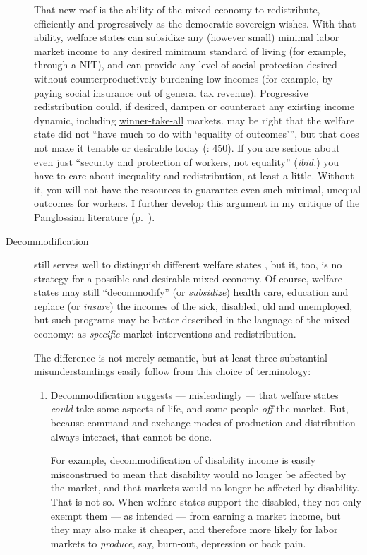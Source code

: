 \begin{description}
	That new roof is the ability of the mixed economy to redistribute, efficiently and progressively as the democratic sovereign wishes. With that ability, welfare states can subsidize any (however small) minimal labor market income to any desired minimum standard of living (for example, through a \gls{NIT}), and can provide any level of social protection desired without counterproductively burdening low incomes (for example, by paying social insurance out of general tax revenue). Progressive redistribution could, if desired, dampen or counteract any existing income dynamic, including \hyperref[sec:winner-take-all]{winner-take-all} markets. \citeauthor{Offe2003} may be right that the welfare state did not ``have much to do with `equality of outcomes''', but that does not make it tenable or desirable today (\citeyear{Offe2003}: 450). If you are serious about even just ``security and protection of workers, not equality'' (\emph{ibid.}) you have to care about inequality and redistribution, at least a little. Without it, you will not have the resources to guarantee even such minimal, unequal outcomes for workers. I further develop this argument  in my critique of the  \hyperref[sec:Pangloss]{Panglossian} literature (p.~\pageref{sec:Pangloss}).

	\item[Decommodification] still serves well to distinguish different welfare states \citep{Esping-Andersen-1990-aa}, but it, too, is no strategy for a possible and desirable mixed economy.  Of course, welfare states may still ``decommodify'' (or \emph{subsidize}) health care, education and replace (or \emph{insure}) the incomes of the sick, disabled, old and unemployed, but such programs may be better described in the language of the mixed economy: as \emph{specific} market interventions and redistribution.

	The difference is not merely semantic, but at least three substantial misunderstandings easily follow from this choice of terminology:
	\begin{enumerate}
		\item Decommodification suggests --- misleadingly --- that welfare states \emph{could} take some aspects of life, and some people \emph{off} the market. But, because command and exchange modes of production and distribution always interact, that cannot be done.

		For example, decommodification of disability income is easily misconstrued to mean that disability would no longer be affected by the market, and that markets would no longer be affected by disability. That is not so. When welfare states support the disabled, they not only exempt them --- as intended --- from earning a market income, but they may also make it cheaper, and therefore more likely for labor markets to \emph{produce}, say, burn-out, depression or back pain.


\end{enumerate}
\end{description}
